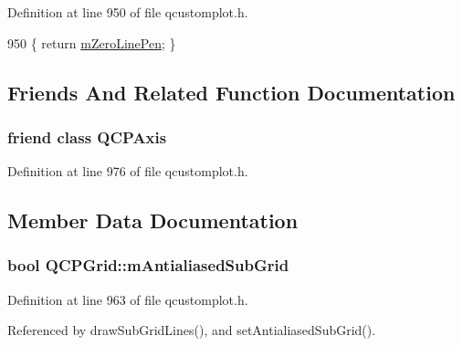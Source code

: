 Definition at line 950 of file qcustomplot.\+h.


\begin{DoxyCode}
950 \{ \textcolor{keywordflow}{return} \hyperlink{class_q_c_p_grid_a379481871f17655c27eda30af233554f}{mZeroLinePen}; \}
\end{DoxyCode}


\subsection{Friends And Related Function Documentation}
\hypertarget{class_q_c_p_grid_af123edeca169ec7a31958a1d714e1a8a}{}
\subsubsection[{Q\+C\+P\+Axis}]{\setlength{\rightskip}{0pt plus 5cm}friend class {\bf Q\+C\+P\+Axis}\hspace{0.3cm}{\ttfamily [friend]}}\label{class_q_c_p_grid_af123edeca169ec7a31958a1d714e1a8a}


Definition at line 976 of file qcustomplot.\+h.



\subsection{Member Data Documentation}
\hypertarget{class_q_c_p_grid_a71b7051f833f0c5de3094998d6afdd87}{}
\subsubsection[{m\+Antialiased\+Sub\+Grid}]{\setlength{\rightskip}{0pt plus 5cm}bool Q\+C\+P\+Grid\+::m\+Antialiased\+Sub\+Grid\hspace{0.3cm}{\ttfamily [protected]}}\label{class_q_c_p_grid_a71b7051f833f0c5de3094998d6afdd87}


Definition at line 963 of file qcustomplot.\+h.



Referenced by draw\+Sub\+Grid\+Lines(), and set\+Antialiased\+Sub\+Grid().

\hypertarget{class_q_c_p_grid_a8c0df56ae86440408c050895dcdb922b}{}
